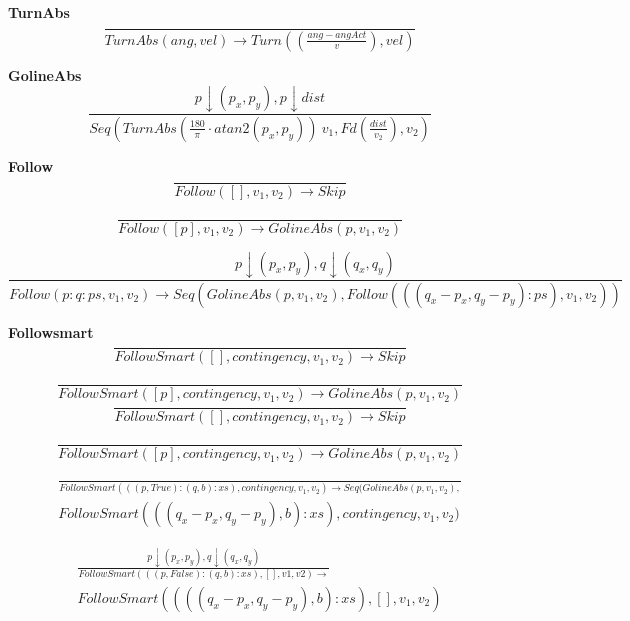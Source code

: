 \documentclass[11pt]{scrartcl}
\begin{document}
\textbf{TurnAbs}
\[
 \frac{}{TurnAbs(ang, vel) \to Turn\left(\left(\frac{ang - angAct}{v}\right), vel\right)}
\]

\textbf{GolineAbs}
\[
 \frac{p \downarrow (p_x,p_y), p \downarrow dist}{Seq (TurnAbs \left(\frac{180}{\pi} \cdot atan2 (p_x, p_y)\right) \ v_1, Fd(\frac{dist}{v_2}), v_2)}
\]

\textbf{Follow}
\begin{equation}
\frac{}{Follow([], v_1, v_2) \to Skip}
\end{equation}
    
\begin{equation}
\frac{}{Follow([p], v_1, v_2) \to GolineAbs(p, v_1, v_2)}
\end{equation}
    
\begin{equation}
 \frac{p \downarrow (p_x,p_y) , q \downarrow (q_x,q_y)}{Follow(p:q:ps, v_1, v_2) \to {Seq(GolineAbs(p, v_1, v_2), Follow(((q_x - p_x, q_y - p_y) : ps), v_1, v_2))}}
\end{equation}

\textbf{Followsmart}
\setcounter{equation}{0}
\begin{equation}
    \frac{}{FollowSmart([], contingency, v_1, v_2) \to Skip}
    \end{equation}
    
    \begin{equation}
    \frac{}{FollowSmart([p], contingency, v_1, v_2) \to GolineAbs(p, v_1, v_2)}
    \end{equation}
    \begin{equation}
\frac{}{FollowSmart([], contingency, v_1, v_2) \to Skip}
\end{equation}
    
\begin{equation}
\frac{}{FollowSmart([p], contingency, v_1, v_2) \to GolineAbs(p, v_1, v_2)}
\end{equation}


\begin{equation}
\begin{split}
\frac{}{FollowSmart(((p,True):(q,b):xs), contingency, v_1, v_2) \to Seq(GolineAbs(p, v_1, v_2), } \\
FollowSmart(((q_x - p_x, q_y - p_y), b):xs), contingency, v_1, v_2)
\end{split}
\end{equation}
    
\begin{equation}
    \begin{split}
\frac{p \downarrow (p_x,p_y) , q \downarrow (q_x,q_y)}{FollowSmart(((p, False):(q,b):xs), [], v1, v2) \to} \\
FollowSmart((((q_x - p_x, q_y - p_y), b):xs), [], v_1, v_2)
    \end{split}
\end{equation}
    
\end{document}

